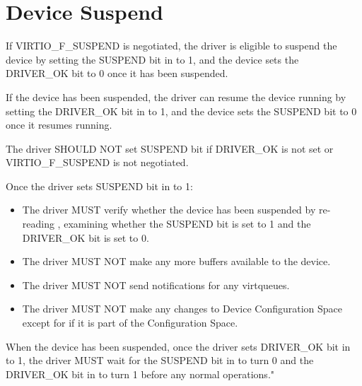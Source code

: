 \section{Device Suspend}\label{sec:General Initialization And Device Operation / Device Suspend}

If VIRTIO_F_SUSPEND is negotiated, the driver is eligible to suspend the device by setting the SUSPEND bit in  to 1, and the device sets the DRIVER_OK bit to 0 once it has been suspended.

If the device has been suspended, the driver can resume the device running by setting the DRIVER_OK bit in  to 1, and the device sets the SUSPEND bit to 0 once it resumes running.


The driver SHOULD NOT set SUSPEND bit if DRIVER_OK is not set or VIRTIO_F_SUSPEND is not negotiated.

Once the driver sets SUSPEND bit in  to 1:
\begin{itemize}
\item The driver MUST verify whether the device has been suspended by re-reading , examining whether the SUSPEND bit is set to 1 and the DRIVER_OK bit is set to 0.
\item The driver MUST NOT make any more buffers available to the device.
\item The driver MUST NOT send notifications for any virtqueues.
\item The driver MUST NOT make any changes to Device Configuration Space except for  if it is part of the Configuration Space.
\end{itemize}

When the device has been suspended, once the driver sets DRIVER_OK bit in  to 1,
the driver MUST wait for the SUSPEND bit in  to turn 0 and the DRIVER_OK bit in  to turn 1
before any normal operations."


